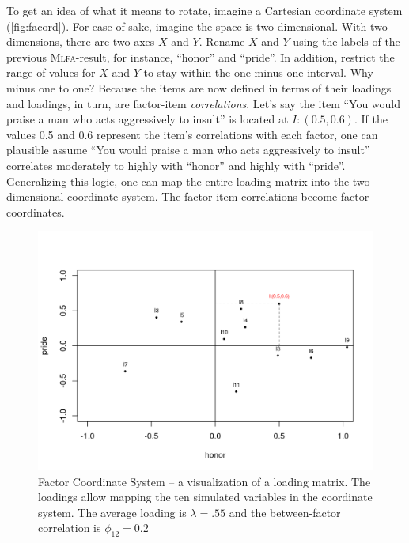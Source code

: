 \documentclass[jou, 11pt]{apa7}
\begin{document}
To get an idea of what it means to rotate, imagine a Cartesian coordinate
system (\autoref{fig:facord}). For ease of sake, imagine the space is
two-dimensional. With two dimensions, there are two axes $X$ and $Y$. Rename
$X$ and $Y$ using the labels of the previous \textsc{Mlfa}-result, for instance,
\enquote{honor} and \enquote{pride}. In addition, restrict the range of values
for $X$ and $Y$ to stay within the one-minus-one interval. Why minus one to
one? Because the items are now defined in terms of their loadings and loadings,
in turn, are factor-item \textit{correlations}. Let’s say the item \enquote{You
would praise a man who acts aggressively to insult} is located at
$I:(0.5,0.6)$. If the values 0.5 and 0.6 represent the item’s correlations with
each factor, one can plausible assume \enquote{You would praise a man who acts
aggressively to insult} correlates moderately to highly with \enquote{honor}
and highly with \enquote{pride}. Generalizing this logic, one can map the
entire loading matrix into the two-dimensional coordinate system. The
factor-item correlations become factor coordinates.

\begin{figure}[htb]
\center
\includegraphics[scale=0.80]{figures/facord-1.png}
\caption[Factor Coordinate System]{
Factor Coordinate System -- a visualization of a loading matrix. The loadings
allow mapping the ten simulated variables in the coordinate system. The average
loading is $\bar\lambda=.55$ and the between-factor correlation is
$\phi_{12}=0.2$}
\label{fig:facord}
\end{figure}
\end{document}
